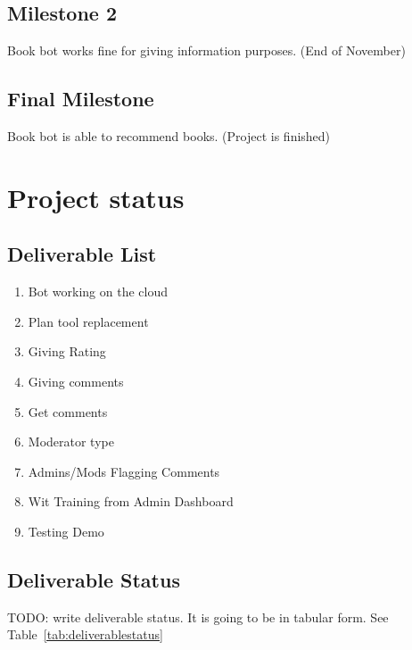 \documentclass[a4paper]{article}
\begin{document}
\subsection{Milestone 2}
Book bot works fine for giving information purposes. (End of November)
\subsection{Final Milestone}
Book bot is able to recommend books. (Project is finished)

\section{Project status}
\subsection{Deliverable List}

\begin{enumerate}

 	\item Bot working on the cloud
 	
 	\item Plan tool replacement
 	
    \item Giving Rating
    
    \item Giving comments
    
    \item Get comments
    
    \item Moderator type 
    
    \item Admins/Mods Flagging Comments
    
    \item Wit Training from Admin Dashboard
 	
 	\item Testing Demo	
 			
 \end{enumerate}

\subsection{Deliverable Status}
TODO: write deliverable status. It is going to be in tabular form. See Table~\ref{tab:deliverablestatus}
\end{document}
